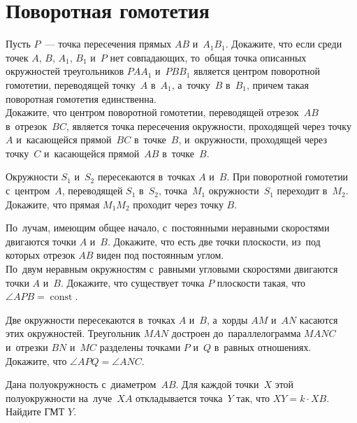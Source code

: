 
\section*{Поворотная гомотетия}


\begingroup
    \def\const{\operatorname{const}}

\begin{problems}

\item
\sp
Пусть $P$~--- точка пересечения прямых $AB$ и~$A_1 B_1$.
Докажите, что если среди точек $A$, $B$, $A_1$, $B_1$ и~$P$ нет совпадающих,
то~общая точка описанных окружностей треугольников $P A A_1$ и~$P B B_1$
является центром поворотной гомотетии, переводящей точку~$A$ в~$A_1$,
а~точку~$B$ в~$B_1$, причем такая поворотная гомотетия единственна.
\\
\sp
Докажите, что центром поворотной гомотетии, переводящей отрезок~$AB$
в~отрезок~$BC$, является точка пересечения окружности, проходящей через
точку~$A$ и~касающейся прямой~$BC$ в~точке~$B$,
и~окружности, проходящей через точку~$C$ и~касающейся прямой~$AB$ в~точке~$B$.

\item
Окружности $S_1$ и~$S_2$ пересекаются в~точках $A$ и~$B$.
При поворотной гомотетии с~центром~$A$, переводящей $S_1$ в~$S_2$, точка~$M_1$
окружности~$S_1$ переходит в~$M_2$.
Докажите, что прямая $M_1 M_2$ проходит через точку $B$.

\item
\sp
По~лучам, имеющим общее начало, с~постоянными неравными скоростями двигаются
точки $A$ и~$B$.
Докажите, что есть две точки плоскости, из~под которых отрезок $AB$ виден под
постоянным углом.
\\
\sp
По~двум неравным окружностям с~равными угловыми скоростями двигаются точки $A$
и~$B$.
Докажите, что существует точка $P$ плоскости такая, что $\angle APB = \const$.

\item
Две окружности пересекаются в~точках $A$ и~$B$, а~хорды $AM$ и~$AN$ касаются
этих окружностей.
Треугольник $MAN$ достроен до~параллелограмма $MANC$ и~отрезки $BN$ и~$MC$
разделены точками $P$ и~$Q$ в~равных отношениях.
Докажите, что $\angle APQ = \angle ANC$.

\item
Дана полуокружность с~диаметром~$AB$.
Для каждой точки~$X$ этой полуокружности на~луче~$XA$ откладывается точка~$Y$
так, что $XY = k \cdot XB$.
Найдите ГМТ $Y$.


\end{problems}
